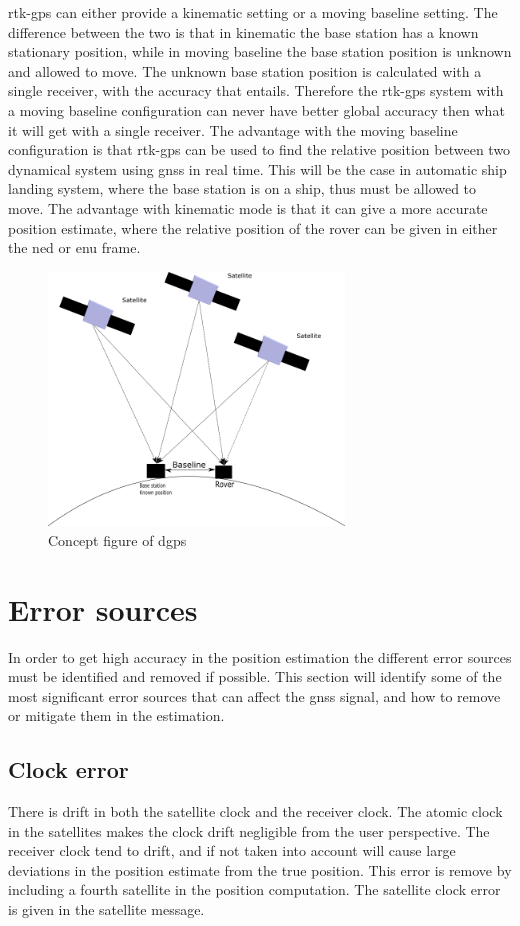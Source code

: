\gls{rtk-gps} can either provide a kinematic setting or a moving baseline setting. The difference between the two is that in kinematic the base station has a known stationary position, while in moving baseline the base station position is unknown and allowed to move. The unknown base station position is calculated with a single receiver, with the accuracy that entails. Therefore the \gls{rtk-gps} system with a moving baseline configuration can never have better global accuracy then what it will get with a single receiver. The advantage with the moving baseline configuration is that \gls{rtk-gps} can be used to find the relative position between two dynamical system using \gls{gnss} in real time. This will be the case in automatic ship landing system, where the base station is on a ship, thus must be allowed to move. The advantage with kinematic mode is that it can give a more accurate position estimate, where the relative position of the rover can be given in either the \gls{ned} or \gls{enu} frame.

\begin{figure}[H]
	\centering
		\includegraphics[width=0.7\textwidth]{figs/DGPS.png}
		\caption{Concept figure of \acrfull{dgps}}
		\label{figure:DGPS}
\end{figure}
\section{Error sources}
In order to get high accuracy in the position estimation the different error sources must be identified and removed if possible. This section will identify some of the most significant error sources that can affect the \gls{gnss} signal, and how to remove or mitigate them in the estimation.
\subsection{Clock error}
There is drift in both the satellite clock and the receiver clock. The atomic clock in the satellites makes the clock drift negligible from the user perspective. The receiver clock tend to drift, and if not taken into account will cause large deviations in the position estimate from the true position. This error is remove by including a fourth satellite in the position computation. The satellite clock error is given in the satellite message. 

